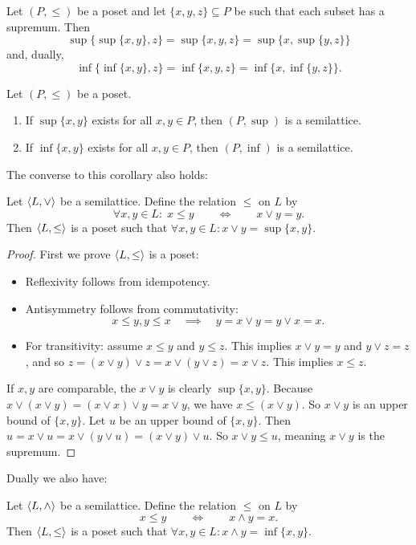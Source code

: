 \begin{proposition}
Let $(P,\leq)$ be a poset and let $\{x,y,z\}\subseteq P$ be such that each subset has a supremum. Then
\[ \sup\{\sup\{x,y\},z\} = \sup\{x,y,z\} = \sup\{x,\sup\{y,z\}\} \]
and, dually,
\[ \inf\{\inf\{x,y\},z\} = \inf\{x,y,z\} = \inf\{x,\inf\{y,z\}\}. \]
\end{proposition}
\begin{corollary}
Let $(P,\leq)$ be a poset.
\begin{enumerate}
\item If $\sup\{x,y\}$ exists for all $x,y\in P$, then $(P,\sup)$ is a semilattice.
\item If $\inf\{x,y\}$ exists for all $x,y\in P$, then $(P,\inf)$ is a semilattice.
\end{enumerate}
\end{corollary}
The converse to this corollary also holds:
\begin{proposition} \label{orderSemilattice}
Let $\langle L,\vee \rangle$ be a semilattice. Define the relation $\leq$ on $L$ by
\[ \forall x,y\in L:\; x\leq y \qquad \iff \qquad x\vee y = y. \]
Then $\langle L,\leq \rangle$ is a poset such that $\forall x,y\in L: x\vee y = \sup\{x,y\}$.
\end{proposition}
\begin{proof}
First we prove $\langle L,\leq \rangle$ is a poset:
\begin{itemize}
\item Reflexivity follows from idempotency.
\item Antisymmetry follows from commutativity:
\[ x\leq y, y\leq x \quad\implies\quad y = x\vee y = y \vee x = x. \]
\item For transitivity: assume $x\leq y$ and $y\leq z$. This implies $x\vee y = y$ and $y\vee z = z$, and so $z = (x\vee y)\vee z =x\vee (y\vee z) =x\vee z$. This implies $x\leq z$.
\end{itemize}
If $x,y$ are comparable, the $x \vee y$ is clearly $\sup\{x,y\}$. Because $x\vee(x\vee y) = (x\vee x)\vee y = x\vee y$, we have $x\leq (x\vee y)$. So $x\vee y$ is an upper bound of $\{x,y\}$. Let $u$ be an upper bound of $\{x,y\}$. Then $u = x\vee u = x\vee (y\vee u) = (x\vee y)\vee u$. So $x\vee y \leq u$, meaning $x\vee y$ is the supremum.
\end{proof}
Dually we also have:
\begin{corollary}
Let $\langle L,\wedge \rangle$ be a semilattice. Define the relation $\leq$ on $L$ by
\[ x\leq y \qquad \iff \qquad x\wedge y = x. \]
Then $\langle L,\leq \rangle$ is a poset such that $\forall x,y\in L: x\wedge y = \inf\{x,y\}$.
\end{corollary}

